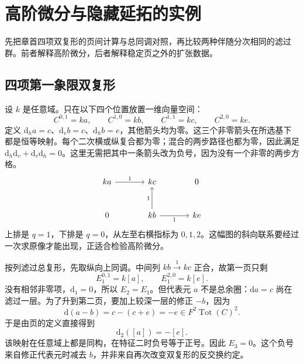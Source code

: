 
\section{高阶微分与隐藏延拓的实例}
\label{b4:sec:1405}

先把章首四项双复形的页间计算与总同调对照，再比较两种伴随分次相同的滤过群。前者解释高阶微分，后者解释稳定页之外的扩张数据。

%
%
%

\subsection{四项第一象限双复形}
\label{b4:subsec:1405:01}

设 \(k\) 是任意域。只在以下四个位置放置一维向量空间：
\[
 C^{0,1}=ka,\qquad C^{1,0}=kb,\qquad
 C^{1,1}=kc,\qquad C^{2,0}=ke.
\]
定义 \(\mathrm{d}_ha=c\)、\(\mathrm{d}_vb=c\)、\(\mathrm{d}_hb=e\)，其他箭头均为零。这三个非零箭头在所选基下都是恒等映射。每个二次横或纵复合都为零；混合的两步路径也都为零，因此满足 \(\mathrm{d}_h\mathrm{d}_v+\mathrm{d}_v\mathrm{d}_h=0\)。这里无需把其中一条箭头改为负号，因为没有一个非零的两步方格。
\[
\begin{tikzcd}[column sep=large,row sep=large]
 ka \arrow[r,"1"] & kc & 0\\
 0 & kb \arrow[u,"1"] \arrow[r,"1"'] & ke
\end{tikzcd}
\]
上排是 \(q=1\)，下排是 \(q=0\)，从左至右横指标为 \(0,1,2\)。这幅图的斜向联系要经过一次求原像才能出现，正适合检验高阶微分。

\ProseParagraphBreak
按列滤过总复形，先取纵向上同调。中间列 \(kb\xrightarrow{1}kc\) 正合，故第一页只剩
\[
 E_1^{0,1}=k[a],\qquad E_1^{2,0}=k[e].
\]
没有相邻非零项，\(\mathrm{d}_1=0\)，所以 \(E_2=E_1\)。但代表元 \(a\) 不是总余圈：\(\mathrm{d}a=c\) 尚在滤过一层。为了升到第二页，要加上较深一层的修正 \(-b\)，因为
\[
 \mathrm{d}(a-b)=c-(c+e)=-e\in F^2\operatorname{Tot}(C)^2.
\]
于是由页的定义直接得到
\begin{equation}\label{b4:eq:nonzero-d2}
 \mathrm{d}_2([a])=-[e].
\end{equation}
该映射在任意域上都是同构，在特征二时负号等于正号。因此 \(E_3=0\)。这个负号来自修正代表元时减去 \(b\)，并非来自再次改变双复形的反交换约定。

